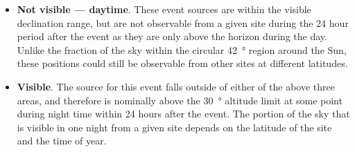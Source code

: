 \begin{colsection}
\begin{itemize}
    \item \textbf{Not visible --- daytime}. These event sources are within the visible declination range, but are not observable from a given site during the 24 hour period after the event as they are only above the horizon during the day. Unlike the fraction of the sky within the circular \SI{42}{\degree} region around the Sun, these positions could still be observable from other sites at different latitudes.

    \item \textbf{Visible}. The source for this event falls outside of either of the above three areas, and therefore is nominally above the \SI{30}{\degree} altitude limit at some point during night time within 24 hours after the event. The portion of the sky that is visible in one night from a given site depends on the latitude of the site and the time of year.
\end{itemize}


\end{colsection}
